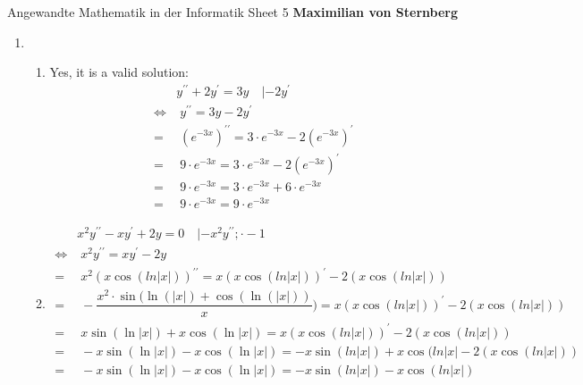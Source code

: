 \documentclass[]{book}
\theoremstyle{definition}
\begin{document}
\begin{center}
{\Large Angewandte Mathematik in der Informatik \hspace{0.5cm} Sheet 5}
\textbf{Maximilian von Sternberg} %
\end{center}

\vspace{0.2 cm}

\begin{enumerate}
    \item \begin{enumerate}
        \item Yes, it is a valid solution:
        \begin{align*}
            & y^{\prime \prime} + 2y^{\prime} = 3y \quad |- 2y^{\prime} \\
            \Leftrightarrow & \; y^{\prime \prime} = 3y - 2y^{\prime} \\
            = & \; (e^{-3x})^{\prime \prime} = 3 \cdot e^{-3x} - 2(e^{-3x})^{\prime} \\
            = & \; 9 \cdot e^{-3x} = 3 \cdot e^{-3x} - 2(e^{-3x})^{\prime} \\
            = & \; 9 \cdot e^{-3x} = 3 \cdot e^{-3x} + 6 \cdot e^{-3x} \\
            = & \; 9 \cdot e^{-3x} = 9 \cdot e^{-3x} 
        \end{align*}
        \item \begin{align*}
            & x^2y^{\prime \prime} - xy^{\prime} + 2y = 0 \quad |- x^2y^{\prime \prime} ; \cdot -1 \\
            \Leftrightarrow & \; x^2y^{\prime \prime} = xy^{\prime} - 2y \\
            = & \; x^2(x \cos(ln |x|))^{\prime \prime} = x(x \cos(ln |x|))^{\prime} - 2(x \cos(ln |x|)) \\
            = & \; -\dfrac{x^2 \cdot \sin(\ln(|x|)+\cos(\ln(|x|))}{x}) = x(x \cos(ln |x|))^{\prime} - 2(x \cos(ln |x|)) \\
            = & \; x \sin(\ln|x|) + x \cos(\ln|x|) = x(x \cos(ln |x|))^{\prime} - 2(x \cos(ln |x|)) \\
            = & \; - x \sin(\ln|x|) - x \cos(\ln|x|) = - x \sin(ln |x|) + x \cos(ln |x| - 2(x \cos(ln |x|)) \\
            = & \; - x \sin(\ln|x|) - x \cos(\ln|x|) = - x \sin(ln |x|) - x \cos(ln |x|) \\
        \end{align*}

\end{enumerate}
\end{enumerate}
\end{document}
